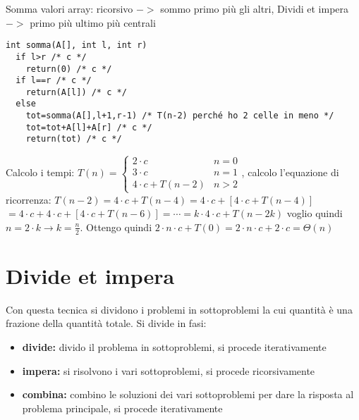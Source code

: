 \documentclass[a4paper,12pt,oneside,tikz]{book}
\begin{document}
\newpage
\begin{esercizio}
	Somma valori array:
	ricorsivo $->$ sommo primo più gli altri, Dividi et impera $->$ primo più ultimo più centrali
	\begin{verbatim}
int somma(A[], int l, int r)
  if l>r /* c */
    return(0) /* c */
  if l==r /* c */
    return(A[l]) /* c */
  else
    tot=somma(A[],l+1,r-1) /* T(n-2) perché ho 2 celle in meno */
    tot=tot+A[l]+A[r] /* c */
    return(tot) /* c */   
\end{verbatim}
	Calcolo i tempi:
	$T(n)=\begin{cases}
			2\cdot c         & n=0 \\
			3\cdot c         & n=1 \\
			4\cdot c+ T(n-2) & n>2
		\end{cases}$, calcolo l'equazione di ricorrenza: $T(n-2)=4\cdot c+T(n-4)= 4\cdot c +\left[4\cdot c + T(n-4)\right]$\\$= 4\cdot c + 4\cdot c+\left[4\cdot c + T(n-6)\right]=\cdots=k\cdot 4\cdot c+T(n-2k)$ voglio quindi $n=2\cdot k\rightarrow k=\frac{n}{2}$. Ottengo quindi $2\cdot n\cdot c+T(0)= 2\cdot n\cdot c +2\cdot c=\Theta(n)$
\end{esercizio}
\section{Divide et impera}
Con questa tecnica si dividono i problemi in sottoproblemi la cui quantità è una frazione della quantità totale. Si divide in fasi:
\begin{itemize}
	\item \textbf{divide:} divido il problema in sottoproblemi, si procede iterativamente
	\item \textbf{impera:} si risolvono i vari sottoproblemi, si procede ricorsivamente
	\item \textbf{combina:} combino le soluzioni dei vari sottoproblemi per dare la risposta al problema principale, si procede iterativamente
\end{itemize}
\end{document}
